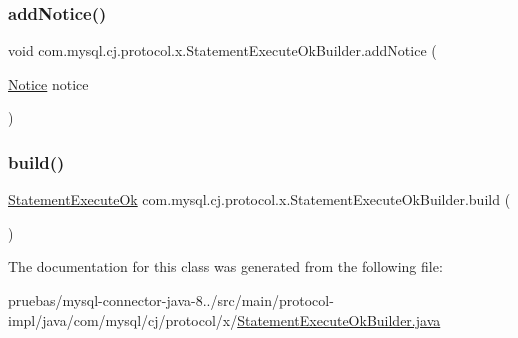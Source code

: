 \subsubsection{\texorpdfstring{add\+Notice()}{addNotice()}}
{\footnotesize\ttfamily void com.\+mysql.\+cj.\+protocol.\+x.\+Statement\+Execute\+Ok\+Builder.\+add\+Notice (\begin{DoxyParamCaption}\item[{\mbox{\hyperlink{classcom_1_1mysql_1_1cj_1_1protocol_1_1x_1_1_notice}{Notice}}}]{notice }\end{DoxyParamCaption})}

\mbox{\label{classcom_1_1mysql_1_1cj_1_1protocol_1_1x_1_1_statement_execute_ok_builder_ab26041f70ee82ba7709d193a5ec1db2f}} 
\subsubsection{\texorpdfstring{build()}{build()}}
{\footnotesize\ttfamily \mbox{\hyperlink{classcom_1_1mysql_1_1cj_1_1protocol_1_1x_1_1_statement_execute_ok}{Statement\+Execute\+Ok}} com.\+mysql.\+cj.\+protocol.\+x.\+Statement\+Execute\+Ok\+Builder.\+build (\begin{DoxyParamCaption}{ }\end{DoxyParamCaption})}



The documentation for this class was generated from the following file\+:\begin{DoxyCompactItemize}
\item 
pruebas/mysql-\/connector-\/java-\/8../src/main/protocol-\/impl/java/com/mysql/cj/protocol/x/\mbox{\hyperlink{_statement_execute_ok_builder_8java}{Statement\+Execute\+Ok\+Builder.\+java}}\end{DoxyCompactItemize}
